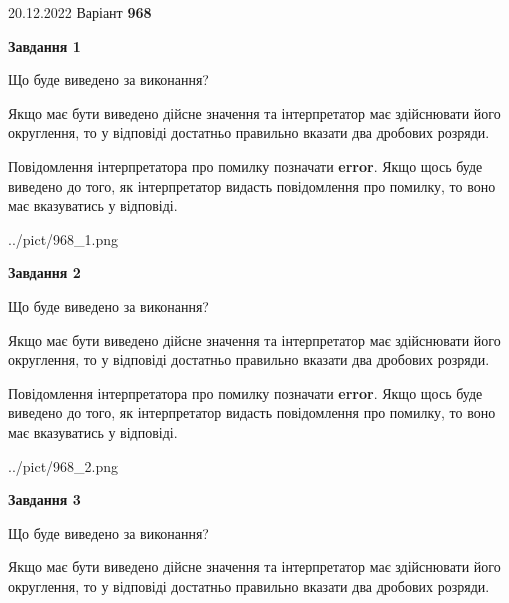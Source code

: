 \documentclass[12pt, ukrainian]{article}
\begin{document}
{20.12.2022 Варіант \No \textbf { 968 }\par}
{
\begin {Large}

{\begin {center}\textbf{Завдання 1}\end {center}}\par
Що буде виведено за виконання? \par

Якщо має бути виведено дійсне значення та інтерпретатор має здійснювати його округлення, 
то у відповіді достатньо правильно вказати два дробових розряди.

Повідомлення інтерпретатора про помилку позначати \textbf{error}.
Якщо щось буде виведено до того, як інтерпретатор видасть повідомлення про помилку, 
то воно має вказуватись у відповіді. \par

\begin{center}
	{../pict/968_1.png}
\end{center}
\newpage

{\begin {center}\textbf{Завдання 2}\end {center}}\par
Що буде виведено за виконання? \par

Якщо має бути виведено дійсне значення та інтерпретатор має здійснювати його округлення, 
то у відповіді достатньо правильно вказати два дробових розряди.

Повідомлення інтерпретатора про помилку позначати \textbf{error}.
Якщо щось буде виведено до того, як інтерпретатор видасть повідомлення про помилку, 
то воно має вказуватись у відповіді. \par

\begin{center}
	{../pict/968_2.png}
\end{center}
\newpage

{\begin {center}\textbf{Завдання 3}\end {center}}\par
Що буде виведено за виконання? \par

Якщо має бути виведено дійсне значення та інтерпретатор має здійснювати його округлення, 
то у відповіді достатньо правильно вказати два дробових розряди.


\end{Large}}
\end{document}
